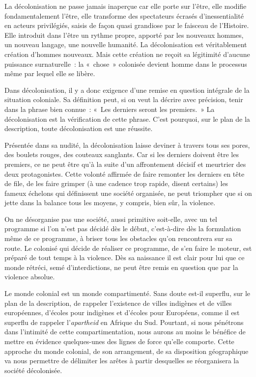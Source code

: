 \documentclass[french,twoside]{book} %
\begin{document}
\bigbreak
\noindent La décolonisation ne passe jamais inaperçue car elle porte sur l’être, elle modifie fondamentalement l’être, elle transforme des spectateurs écrasés d’inessentialité en acteurs privilégiés, saisis de façon quasi grandiose par le faisceau de l’Histoire. Elle introduit dans l’être un rythme propre, apporté par les nouveaux hommes, un nouveau langage, une nouvelle humanité. La décolonisation est véritablement création d’hommes nouveaux. Mais cette création ne reçoit sa légitimité d’aucune puissance surnaturelle : la « chose » colonisée devient homme dans le processus même par lequel elle se libère.\par
Dans décolonisation, il y a donc exigence d’une remise en question intégrale de la situation coloniale. Sa définition peut, si on veut la décrire avec précision, tenir dans la phrase bien connue : « Les derniers seront les premiers. » La décolonisation est la vérification de cette phrase. C’est pourquoi, sur le plan de la description, toute décolonisation est une réussite.\par
\bigbreak
\noindent Présentée dans sa nudité, la décolonisation laisse deviner à travers tous ses pores, des boulets rouges, des couteaux sanglants.   Car si les derniers doivent être les premiers, ce ne peut être qu’à la suite d’un affrontement décisif et meurtrier des deux protagonistes. Cette volonté affirmée de faire remonter les derniers en tête de file, de les faire grimper (à une cadence trop rapide, disent certains) les fameux échelons qui définissent une société organisée, ne peut triompher que si on jette dans la balance tous les moyens, y compris, bien sûr, la violence.\par
\bigbreak
\noindent On ne désorganise pas une société, aussi primitive soit-elle, avec un tel programme si l’on n’est pas décidé dès le début, c’est-à-dire dès la formulation même de ce programme, à briser tous les obstacles qu’on rencontrera sur sa route. Le colonisé qui décide de réaliser ce programme, de s’en faire le moteur, est préparé de tout temps à la violence. Dès sa naissance il est clair pour lui que ce monde rétréci, semé d’interdictions, ne peut être remis en question que par la violence absolue.\par
Le monde colonial est un monde compartimenté. Sans doute est-il superflu, sur le plan de la description, de rappeler l’existence de villes indigènes et de villes européennes, d’écoles pour indigènes et d’écoles pour Européens, comme il est superflu de rappeler l’\emph{apartheid} en Afrique du Sud. Pourtant, si nous pénétrons dans l’intimité de cette compartimentation, nous aurons au moins le bénéfice de mettre en évidence quelques-unes des lignes de force qu’elle comporte. Cette approche du monde colonial, de son arrangement, de sa disposition géographique va nous permettre de délimiter les arêtes à partir desquelles se réorganisera la société décolonisée.\par
\end{document}
